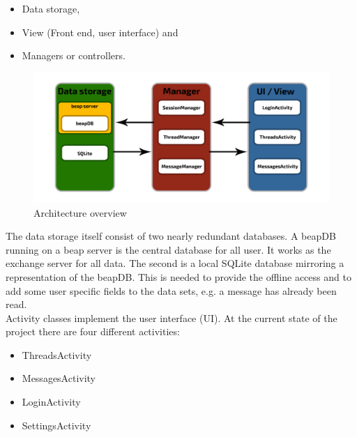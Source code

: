 \documentclass[12pt,a4paper,oneside]{report}
\newcommand{\beapDB}{beapDB}
\newcommand{\beapServer}{beap server}
\begin{document}
\begin{itemize}
\item{Data storage,}
\item{View (Front end, user interface) and}
\item{Managers or controllers.}
\end{itemize}

\begin{figure}[!ht]
    \includegraphics[width=\linewidth]{ArchitectureOV.png}
	\caption{Architecture overview} 
	\label{fig:ArchOV}
\end{figure}

The data storage itself consist of two nearly redundant databases. A \beapDB{} running on a \beapServer{} is the central database for all user. It works as the exchange server for all data. The second is a local SQLite database mirroring a representation of the \beapDB{}. This is needed to provide the offline access and to add some user specific fields to the data sets, e.g. a message has already been read.\\
Activity classes implement the user interface (UI). At the current state of the project there are four different activities:

\begin{itemize}
\item{ThreadsActivity}
\item{MessagesActivity}
\item{LoginActivity}
\item{SettingsActivity}
\end{itemize}
\end{document}

